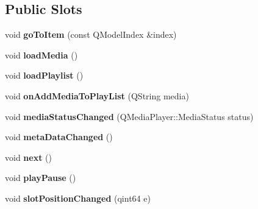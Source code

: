 \subsection*{Public Slots}
\begin{DoxyCompactItemize}
\item 
\hypertarget{class_main_window_a32e621ebdb3ef2d76bd607af16e8d0d0}{void {\bfseries go\-To\-Item} (const Q\-Model\-Index \&index)}\label{class_main_window_a32e621ebdb3ef2d76bd607af16e8d0d0}

\item 
\hypertarget{class_main_window_a5dc0f9a967ac6c534cfbf6e517275ba9}{void {\bfseries load\-Media} ()}\label{class_main_window_a5dc0f9a967ac6c534cfbf6e517275ba9}

\item 
\hypertarget{class_main_window_ac877ae03abf6415808e0bb36ff71e5be}{void {\bfseries load\-Playlist} ()}\label{class_main_window_ac877ae03abf6415808e0bb36ff71e5be}

\item 
\hypertarget{class_main_window_a8bb0a943725aa0d7959a8a93da3194fc}{void {\bfseries on\-Add\-Media\-To\-Play\-List} (Q\-String media)}\label{class_main_window_a8bb0a943725aa0d7959a8a93da3194fc}

\item 
\hypertarget{class_main_window_a2758962312cc237231c349b21603d9fe}{void {\bfseries media\-Status\-Changed} (Q\-Media\-Player\-::\-Media\-Status status)}\label{class_main_window_a2758962312cc237231c349b21603d9fe}

\item 
\hypertarget{class_main_window_aa4ec6868c3ee50f63ffe4803a7136ae6}{void {\bfseries meta\-Data\-Changed} ()}\label{class_main_window_aa4ec6868c3ee50f63ffe4803a7136ae6}

\item 
\hypertarget{class_main_window_aabed273350d064a3a8d73afb01848fea}{void {\bfseries next} ()}\label{class_main_window_aabed273350d064a3a8d73afb01848fea}

\item 
\hypertarget{class_main_window_a6e12ed66de9615bf272f92a47cd5e6c8}{void {\bfseries play\-Pause} ()}\label{class_main_window_a6e12ed66de9615bf272f92a47cd5e6c8}

\item 
\hypertarget{class_main_window_a44f59c80c2093aaaca31cfc82def698f}{void {\bfseries slot\-Position\-Changed} (qint64 e)}\label{class_main_window_a44f59c80c2093aaaca31cfc82def698f}


\end{DoxyCompactItemize}
